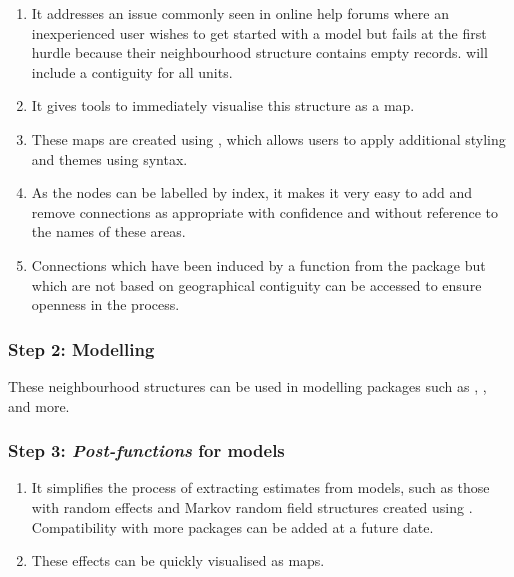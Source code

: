 \begin{enumerate}
\def\labelenumi{\arabic{enumi}.}
\item
  It addresses an issue commonly seen in online help forums where an inexperienced user wishes to get started with a model but fails at the first hurdle because their neighbourhood structure contains empty records.  will include a contiguity for all units.
\item
  It gives tools to immediately visualise this structure as a map.
\item
  These maps are created using  \citep{ggplot2}, which allows users to apply additional styling and themes using  syntax.
\item
  As the nodes can be labelled by index, it makes it very easy to add and remove connections as appropriate with confidence and without reference to the names of these areas.
\item
  Connections which have been induced by a function from the package but which are not based on geographical contiguity can be accessed to ensure openness in the process.
\end{enumerate}

\subsubsection{Step 2: Modelling}\label{step-2-modelling}

These neighbourhood structures can be used in modelling packages such as ,  \citep{brms},  \citep{r-inla} and more.

\subsubsection{\texorpdfstring{Step 3: \emph{Post-functions} for models}{Step 3: Post-functions for models}}\label{step-3-post-functions-for-models}

\begin{enumerate}
\def\labelenumi{\arabic{enumi}.}
\item
  It simplifies the process of extracting estimates from models, such as those with random effects and Markov random field structures created using . Compatibility with more packages can be added at a future date.
\item
  These effects can be quickly visualised as  maps.
\end{enumerate}

